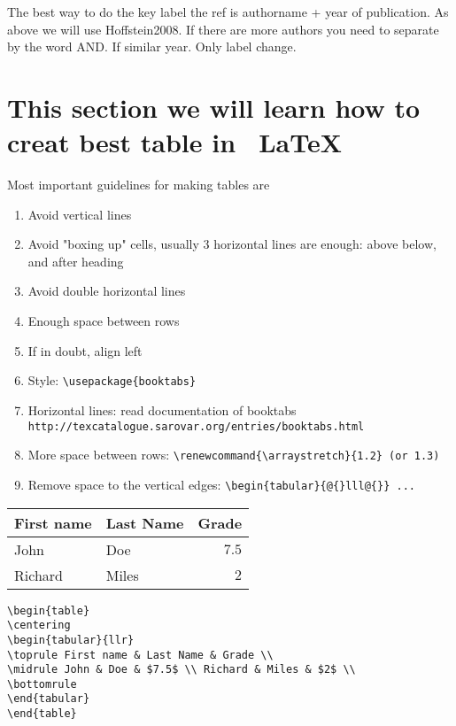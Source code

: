 The best way to do the key label the ref is authorname + year of publication. As above we will use Hoffstein2008. If there are more authors you need to separate by the word AND. If similar year. Only label change.

\section{This section we will learn how to creat best table in \, \LaTeX }

Most important guidelines for making tables are

\begin{enumerate}
\item Avoid vertical lines
\item Avoid "boxing up" cells, usually 3 horizontal lines are enough: above below, and after heading
\item Avoid double horizontal lines
\item Enough space between rows
\item If in doubt, align left
\item Style: \verb|\usepackage{booktabs}|
\item Horizontal lines: read documentation of booktabs \verb| http://texcatalogue.sarovar.org/entries/booktabs.html|
\item More space between rows: \verb|\renewcommand{\arraystretch}{1.2} (or 1.3)|
\item Remove space to the vertical edges: \verb|\begin{tabular}{@{}lll@{}} ...|
\end{enumerate}

\begin{table}[h]
\centering
\begin{tabular}{llr}
\toprule First name & Last Name & Grade \\ 
\midrule John & Doe & $7.5$ \\ Richard & Miles & $2$ \\ 
\bottomrule 
\end{tabular} 
\end{table}

\begin{verbatim}
\begin{table}
\centering
\begin{tabular}{llr}
\toprule First name & Last Name & Grade \\ 
\midrule John & Doe & $7.5$ \\ Richard & Miles & $2$ \\ 
\bottomrule 
\end{tabular} 
\end{table}
\end{verbatim}


